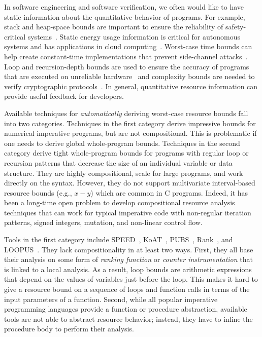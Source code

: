 \documentclass{sigplanconf}
\begin{document}
In software engineering and software verification,
we often would like to have static information
about the quantitative behavior of programs.
For example, stack and heap-space bounds
are important to ensure the reliability of
safety-critical systems~\cite{Regehr05}.
Static energy usage information is critical
for autonomous systems and has applications in
cloud computing~\cite{CohenZSL12,CarrollH10}.
Worst-case time bounds can help create
constant-time implementations that prevent
side-channel attacks~\cite{KasperS09,BartheBCLP14}.
Loop and recursion-depth bounds are used to
ensure the accuracy of programs that are executed
on unreliable hardware~\cite{CarbinMR13} and
complexity bounds are needed to verify cryptographic
protocols~\cite{BartheGB09}.  In general, quantitative
resource information %
can provide useful
feedback for developers.





Available techniques for {\em automatically} deriving worst-case
resource bounds fall into two categories.  Techniques in the first
category derive impressive bounds for numerical imperative programs,
but are not compositional.  This is problematic if one needs to derive
global whole-program bounds.
Techniques in the second category derive
tight whole-program bounds for programs with regular loop or
recursion patterns that decrease the size of an individual variable or
data structure. They are highly compositional, scale for large
programs, and work directly on the syntax.  However,
they do not support multivariate interval-based resource bounds
(e.g., $x-y$) which are common in C programs. Indeed,
it has been a long-time open problem to develop compositional
resource analysis techniques that can work for typical imperative code
with non-regular iteration patterns, signed integers, mutation, and non-linear
control flow. %

Tools in the first category include
SPEED~\cite{GulwaniMC09}, KoAT~\cite{BrockschmidtEFFG14},
PUBS~\cite{AlbertAGPZ12}, Rank~\cite{AliasDFG10},
and LOOPUS~\cite{SinnZV14}.
They lack compositionality in at least two ways.
First, they all base their analysis on some form of
\emph{ranking function} or \emph{counter instrumentation}
that is linked to a local analysis.  As a result, loop bounds are
arithmetic expressions that depend on the values of
variables just before the loop.
This makes it hard to give a
resource bound on a sequence of loops and function calls in
terms of the input parameters of a function.
Second, while all popular imperative programming languages
provide a function or procedure abstraction, available
tools are not able to abstract resource behavior;
instead, they have to inline the procedure body to perform their
analysis.
\end{document}
